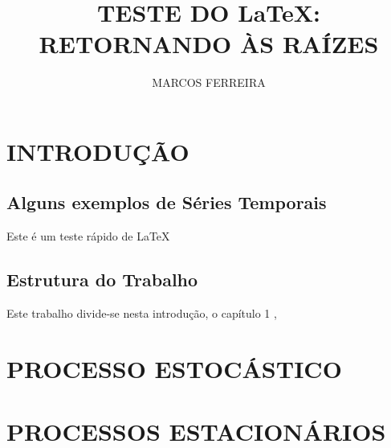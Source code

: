 \documentclass[12pt,a4paper]{book}
\title{TESTE DO \LaTeX: RETORNANDO ÀS RAÍZES}
\author{MARCOS FERREIRA}
\begin{document}
	\chapter{INTRODUÇÃO}
	\section{Alguns exemplos de Séries Temporais}
		Este é um teste rápido de \LaTeX 
	\section{Estrutura do Trabalho}
		Este trabalho divide-se nesta introdução, o capítulo 1 ,\cite{dinardo1997econometric,morettin2018analise}\cite{tripathi2000econometric,hamilton2020time}
	
	\chapter{PROCESSO ESTOCÁSTICO}
	\chapter{PROCESSOS ESTACIONÁRIOS}
		
	
		
\end{document}
